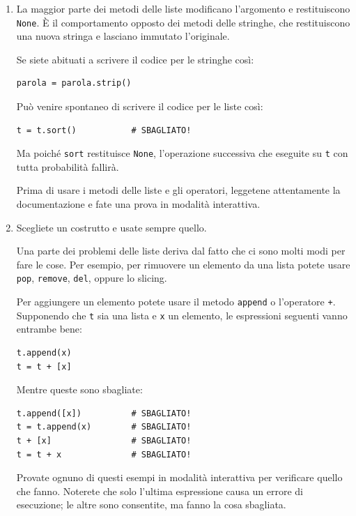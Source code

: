 \documentclass[10pt]{book}
\begin{document}
\begin{enumerate}

\item La maggior parte dei metodi delle liste modificano l'argomento e restituiscono {\tt None}.  È il comportamento opposto dei metodi delle stringhe, che restituiscono una nuova stringa e lasciano immutato l'originale.

Se siete abituati a scrivere il codice per le stringhe così:

\begin{verbatim}
parola = parola.strip()
\end{verbatim}

Può venire spontaneo di scrivere il codice per le liste così:

\begin{verbatim}
t = t.sort()           # SBAGLIATO!
\end{verbatim}

Ma poiché {\tt sort} restituisce {\tt None}, l'operazione successiva che eseguite su {\tt t} con tutta probabilità fallirà.

Prima di usare i metodi delle liste e gli operatori, leggetene attentamente la documentazione e fate una prova in modalità interattiva.


\item Scegliete un costrutto e usate sempre quello.

Una parte dei problemi delle liste deriva dal fatto che ci sono molti modi per fare le cose. Per esempio, per rimuovere un elemento da una lista potete usare {\tt pop}, {\tt remove}, {\tt del}, oppure lo slicing.

Per aggiungere un elemento potete usare il metodo {\tt append} o l'operatore {\tt +}. Supponendo che {\tt t} sia una lista e {\tt x} un elemento, le espressioni seguenti vanno entrambe bene:

\begin{verbatim}
t.append(x)
t = t + [x]
\end{verbatim}

Mentre queste sono sbagliate:

\begin{verbatim}
t.append([x])          # SBAGLIATO!
t = t.append(x)        # SBAGLIATO!
t + [x]                # SBAGLIATO!
t = t + x              # SBAGLIATO!
\end{verbatim}

Provate ognuno di questi esempi in modalità interattiva per verificare quello che fanno. Noterete che solo l'ultima espressione causa un errore di esecuzione; le altre sono consentite, ma fanno la cosa sbagliata.



\end{enumerate}
\end{document}
